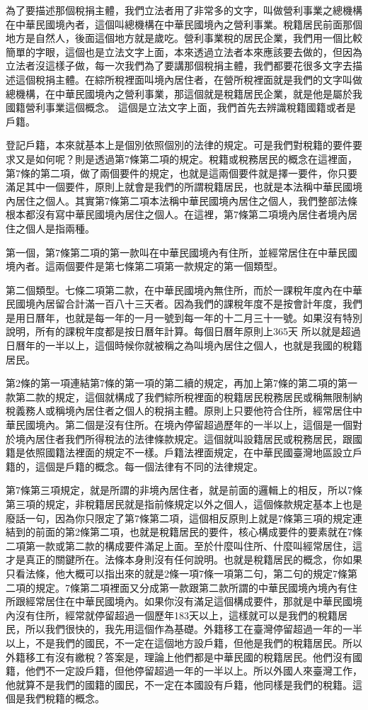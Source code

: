 \documentclass[]{ctexbook}
\begin{document}
為了要描述那個稅捐主體，我們立法者用了非常多的文字，叫做營利事業之總機構在中華民國境內者，這個叫總機構在中華民國境內之營利事業。稅籍居民前面那個地方是自然人，後面這個地方就是歲吃。營利事業稅的居民企業，我們用一個比較簡單的字眼，這個也是立法文字上面，本來透過立法者本來應該要去做的，但因為立法者沒這樣子做，每一次我們為了要講那個稅捐主體，我們都要花很多文字去描述這個稅捐主體。在綜所稅裡面叫境內居住者，在營所稅裡面就是我們的文字叫做總機構，在中華民國境內之營利事業，那這個就是稅籍居民企業，就是他是屬於我國籍營利事業這個概念。
這個是立法文字上面，我們首先去辨識稅籍國籍或者是戶籍。

登記戶籍，本來就基本上是個別依照個別的法律的規定。可是我們對稅籍的要件要求又是如何呢？則是透過第7條第二項的規定。稅籍或稅務居民的概念在這裡面，第7條的第二項，做了兩個要件的規定，也就是這兩個要件就是擇一要件，你只要滿足其中一個要件，原則上就會是我們的所謂稅籍居民，也就是本法稱中華民國境內居住之個人。其實第7條第二項本法稱中華民國境內居住之個人，我們整部法條根本都沒有寫中華民國境內居住之個人。在這裡，第7條第二項境內居住者境內居住之個人是指兩種。

第一個，第7條第二項的第一款叫在中華民國境內有住所，並經常居住在中華民國境內者。這兩個要件是第七條第二項第一款規定的第一個類型。

第二個類型。七條二項第二款，在中華民國境內無住所，而於一課稅年度內在中華民國境內居留合計滿一百八十三天者。因為我們的課稅年度不是按會計年度，我們是用日曆年，也就是每一年的一月一號到每一年的十二月三十一號。如果沒有特別說明，所有的課稅年度都是按日曆年計算。每個日曆年原則上365天 所以就是超過日曆年的一半以上，這個時候你就被稱之為叫境內居住之個人，也就是我國的稅籍居民。

第2條的第一項連結第7條的第一項的第二續的規定，再加上第7條的第二項的第一款第二款的規定，這個就構成了我們綜所稅裡面的稅籍居民稅務居民或稱無限制納稅義務人或稱境內居住者之個人的稅捐主體。原則上只要他符合住所，經常居住中華民國境內。第二個是沒有住所。在境內停留超過歷年的一半以上，這個是一個對於境內居住者我們所得稅法的法律條款規定。這個就叫設籍居民或稅務居民，跟國籍是依照國籍法裡面的規定不一樣。戶籍法裡面規定，在中華民國臺灣地區設立戶籍的，這個是戶籍的概念。每一個法律有不同的法律規定。

第7條第三項規定，就是所謂的非境內居住者，就是前面的邏輯上的相反，所以7條第三項的規定，非稅籍居民就是指前條規定以外之個人，這個條款規定基本上也是廢話一句，因為你只限定了第7條第二項，這個相反原則上就是7條第三項的規定連結到的前面的第2條第二項，也就是稅籍居民的要件，核心構成要件的要素就在7條二項第一款或第二款的構成要件滿足上面。至於什麼叫住所、什麼叫經常居住，這才是真正的關鍵所在。法條本身則沒有任何說明。也就是稅籍居民的概念，你如果只看法條，他大概可以指出來的就是2條一項7條一項第二句，第二句的規定7條第二項的規定。7條第二項裡面又分成第一款跟第二款所謂的中華民國境內境內有住所跟經常居住在中華民國境內。如果你沒有滿足這個構成要件，那就是中華民國境內沒有住所，經常就停留超過一個歷年183天以上，這樣就可以是我們的稅籍居民，所以我們很快的，我先用這個作為基礎。外籍移工在臺灣停留超過一年的一半以上，不是我們的國民，不一定在這個地方設戶籍，但他是我們的稅籍居民。所以外籍移工有沒有繳稅？答案是，理論上他們都是中華民國的稅籍居民。他們沒有國籍，他們不一定設戶籍，但他停留超過一年的一半以上。所以外國人來臺灣工作，他就算不是我們的國籍的國民，不一定在本國設有戶籍，他同樣是我們的稅籍。這個是我們稅籍的概念。
\end{document}
